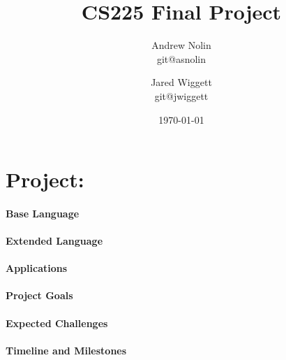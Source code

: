 \title{CS225 Final Project}
\author{Andrew Nolin \\ git@asnolin \and Jared Wiggett \\ git@jwiggett}
\date{\today}


\maketitle

\section*{Project: }

\paragraph{Base Language}

\paragraph{Extended Language}

\paragraph{Applications}

\paragraph{Project Goals}

\paragraph{Expected Challenges}

\paragraph{Timeline and Milestones}


